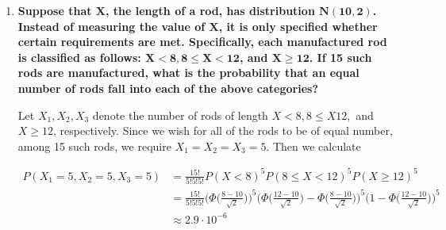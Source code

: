 \documentclass[10pt, oneside]{article}
\begin{document}
\begin{enumerate}[label=9.\arabic*]
where $C$ is such that

\[ C \int^\gamma_\tau \frac{1}{\sqrt{2\pi} \sigma} \exp \bigg[ -\frac{1}{2} \bigg( \frac{x-\mu}{\sigma} \bigg)^2 \bigg] \ dx = 1  \]

Immediately, we can see that

\[ C = \frac{1}{\Phi \big( \frac{\gamma - \mu}{\sigma} \big) - \Phi \big( \frac{\tau - \mu}{\sigma} \big) } \]

Thus our desired distribution is given by

\[
\boxed{
f(x) = \begin{dcases}
0, & x \leq \tau \\
\frac{1}{\Phi \big( \frac{\gamma - \mu}{\sigma} \big) - \Phi \big( \frac{\tau - \mu}{\sigma} \big) } \frac{1}{\sqrt{2\pi} \sigma} \exp \bigg[ -\frac{1}{2} \bigg( \frac{x-\mu}{\sigma} \bigg)^2 \bigg], & \tau < x < \gamma \\
0, & x \geq \gamma
\end{dcases}
}
\]

\item  \begin{tcolorbox}[
  colback=Cerulean!5!white,
  colframe=Cerulean!75!black]
\textbf{Suppose that $\bm{X}$, the length of a rod, has distribution $\bm{N(10,2)}$. Instead of measuring the value of $\bm{X}$, it is only specified whether certain requirements are met. Specifically, each manufactured rod is classified as follows: $\bm{X < 8, 8 \leq X < 12}$, and $\bm{X \geq 12}$. If 15 such rods are manufactured, what is the probability that an equal number of rods fall into each of the above categories?}
\end{tcolorbox}

Let $X_1, X_2, X_3$ denote the number of rods of length $X < 8, 8 \leq X 12,$ and $X \geq 12$, respectively. Since we wish for all of the rods to be of equal number, among 15 such rods, we require $X_1 = X_2 = X_3 = 5$. Then we calculate

\begin{align*}
P(X_1 = 5, X_2 = 5, X_3 = 5) &= \frac{15!}{5! 5! 5!} P(X < 8)^5 P(8 \leq X < 12)^5 P(X \geq 12)^5 \\
&= \frac{15!}{5! 5! 5!} \bigg( \Phi \bigg( \frac{8-10}{\sqrt{2}} \bigg) \bigg)^5 \bigg( \Phi \bigg( \frac{12-10}{\sqrt{2}} \bigg) - \Phi \bigg( \frac{8-10}{\sqrt{2}} \bigg) \bigg)^5 \bigg( 1- \Phi \bigg( \frac{12-10}{\sqrt{2}} \bigg) \bigg)^5 \\
&\approx \boxed{2.9 \cdot 10^{-6}}
\end{align*}


\end{enumerate}
\end{document}
